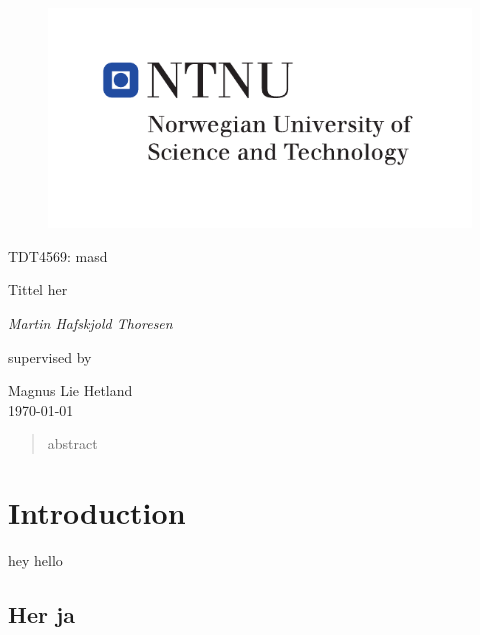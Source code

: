 \documentclass[b5paper]{report}
\theoremstyle{plain}
\theoremstyle{definition}
\begin{document}
\begin{titlepage}
  \centering
  \begin{figure}[h]
    \centering
    \includegraphics{hovedlogo_eng.pdf}
  \end{figure}
  \vspace{1.5cm}
  {\Large TDT4569: masd \par}
  \vspace{1cm}
  {\huge Tittel her\par}
  \vspace{2cm}
  {\Large\itshape{}Martin Hafskjold Thoresen\par}
  \vfill
  supervised by\par
  \large Magnus Lie Hetland\\
  \vspace{1cm}
  {\large \today\\}
\end{titlepage}



\begin{abstract}
  abstract
\end{abstract}

\tableofcontents

\chapter{Introduction}

hey hello\cite{linus}








\begin{appendices}
  \chapter{Her ja}
\end{appendices}
\end{document}
